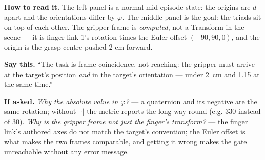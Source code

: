 \documentclass[11pt]{article}
\begin{document}
\textbf{How to read it.} The left panel is a normal mid-episode state: the origins are $d$ apart and the orientations differ by $\varphi$. The middle panel is the goal: the triads sit on top of each other. The gripper frame is \emph{computed}, not a Transform in the scene --- it is finger link 1's rotation times the Euler offset $(-90,90,0)$, and the origin is the grasp centre pushed 2 cm forward.

\textbf{Say this.} ``The task is frame coincidence, not reaching: the gripper must arrive at the target's position \emph{and} in the target's orientation --- under 2~cm and 1.15\textdegree{} at the same time.''

\textbf{If asked.} \emph{Why the absolute value in $\varphi$?} --- a quaternion and its negative are the same rotation; without $|\cdot|$ the metric reports the long way round (e.g. 330\textdegree{} instead of 30\textdegree). \emph{Why is the gripper frame not just the finger's transform?} --- the finger link's authored axes do not match the target's convention; the Euler offset is what makes the two frames comparable, and getting it wrong makes the gate unreachable without any error message.
\clearpage
\end{document}
